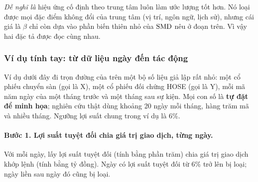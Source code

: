 \begin{delam}
\emph{Dễ nghĩ là} hiệu ứng cố định theo trung tâm luôn làm ước lượng tốt hơn. Nó loại được mọi đặc điểm không đổi của trung tâm (vị trí, ngôn ngữ, lịch sử), nhưng cái giá là $\beta$ chỉ còn dựa vào phần biến thiên nhỏ của $\mathrm{SMD}$ nêu ở đoạn trên. Vì vậy hai đặc tả được đọc cùng nhau.
\end{delam}

\subsubsection*{Ví dụ tính tay: từ dữ liệu ngày đến tác động}

Ví dụ dưới đây đi trọn đường của  trên một bộ số liệu giả lập rất nhỏ: một cổ phiếu chuyển sàn (gọi là X), một cổ phiếu đối chứng HOSE (gọi là Y), mỗi mã năm ngày của một tháng trước và một tháng sau sự kiện. Mọi con số là \textbf{tự đặt để minh họa}; nghiên cứu thật dùng khoảng 20 ngày mỗi tháng, hàng trăm mã và nhiều tháng. Ngưỡng lợi suất chung trong ví dụ là 6\%.

\paragraph{Bước 1. Lợi suất tuyệt đối chia giá trị giao dịch, từng ngày.}

Với mỗi ngày, lấy lợi suất tuyệt đối (tính bằng phần trăm) chia giá trị giao dịch khớp lệnh (tính bằng tỷ đồng). Ngày có lợi suất tuyệt đối từ 6\% trở lên bị loại; ngày liền sau ngày đó cũng bị loại.

